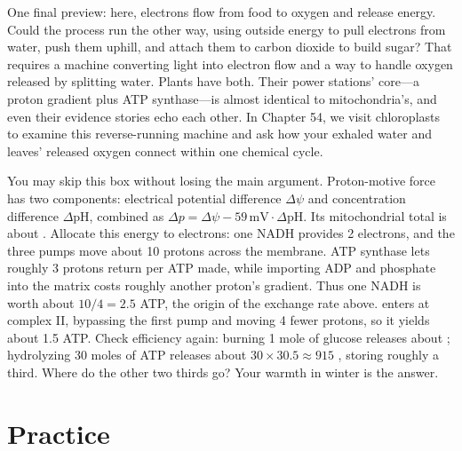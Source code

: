 One final preview: here, electrons flow from food to oxygen and release energy. Could the process run the other way, using outside energy to pull electrons from water, push them uphill, and attach them to carbon dioxide to build sugar? That requires a machine converting light into electron flow and a way to handle oxygen released by splitting water. Plants have both. Their power stations' core---a proton gradient plus ATP synthase---is almost identical to mitochondria's, and even their evidence stories echo each other. In Chapter 54, we visit chloroplasts to examine this reverse-running machine and ask how your exhaled water and leaves' released oxygen connect within one chemical cycle.

\begin{tiaozhan}
You may skip this box without losing the main argument. Proton-motive force has two components: electrical potential difference $\Delta\psi$ and concentration difference $\Delta\mathrm{pH}$, combined as $\Delta p = \Delta\psi - 59\,\mathrm{mV}\cdot\Delta\mathrm{pH}$. Its mitochondrial total is about . Allocate this energy to electrons: one NADH provides 2 electrons, and the three pumps move about 10 protons across the membrane. ATP synthase lets roughly 3 protons return per ATP made, while importing ADP and phosphate into the matrix costs roughly another proton's gradient. Thus one NADH is worth about $10/4 = 2.5$ ATP, the origin of the exchange rate above.  enters at complex II, bypassing the first pump and moving 4 fewer protons, so it yields about 1.5 ATP. Check efficiency again: burning 1 mole of glucose releases about ; hydrolyzing 30 moles of ATP releases about $30\times 30.5 \approx 915$ , storing roughly a third. Where do the other two thirds go? Your warmth in winter is the answer.
\end{tiaozhan}

\section*{Practice}

